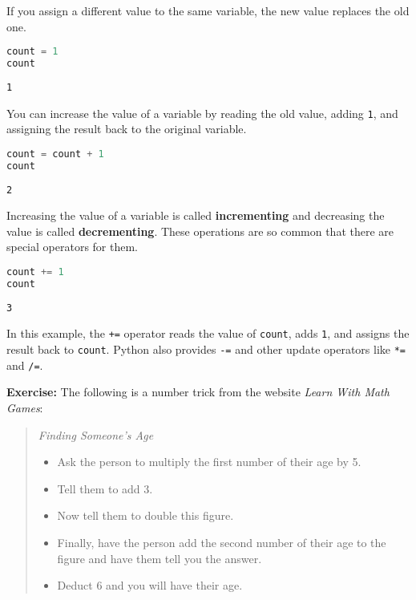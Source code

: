 \pagebreak

If you assign a different value to the same variable, the new value
replaces the old one.

\begin{lstlisting}[language=Python,style=source]
count = 1
count
\end{lstlisting}

\begin{lstlisting}[style=output]
1
\end{lstlisting}

You can increase the value of a variable by reading the old value,
adding \passthrough{\lstinline!1!}, and assigning the result back to the
original variable.

\begin{lstlisting}[language=Python,style=source]
count = count + 1
count
\end{lstlisting}

\begin{lstlisting}[style=output]
2
\end{lstlisting}

Increasing the value of a variable is called \textbf{incrementing} and
decreasing the value is called \textbf{decrementing}. These operations
are so common that there are special operators for them.

\begin{lstlisting}[language=Python,style=source]
count += 1
count
\end{lstlisting}

\begin{lstlisting}[style=output]
3
\end{lstlisting}

In this example, the \passthrough{\lstinline!+=!} operator reads the
value of \passthrough{\lstinline!count!}, adds
\passthrough{\lstinline!1!}, and assigns the result back to
\passthrough{\lstinline!count!}. Python also provides
\passthrough{\lstinline!-=!} and other update operators like
\passthrough{\lstinline!*=!} and \passthrough{\lstinline!/=!}.

\textbf{Exercise:} The following is a number trick from the website
\emph{Learn With Math Games}:

\begin{quote}
\emph{Finding Someone's Age}

\begin{itemize}
\item
  Ask the person to multiply the first number of their age by 5.
\item
  Tell them to add 3.
\item
  Now tell them to double this figure.
\item
  Finally, have the person add the second number of their age to the
  figure and have them tell you the answer.
\item
  Deduct 6 and you will have their age.
\end{itemize}
\end{quote}


